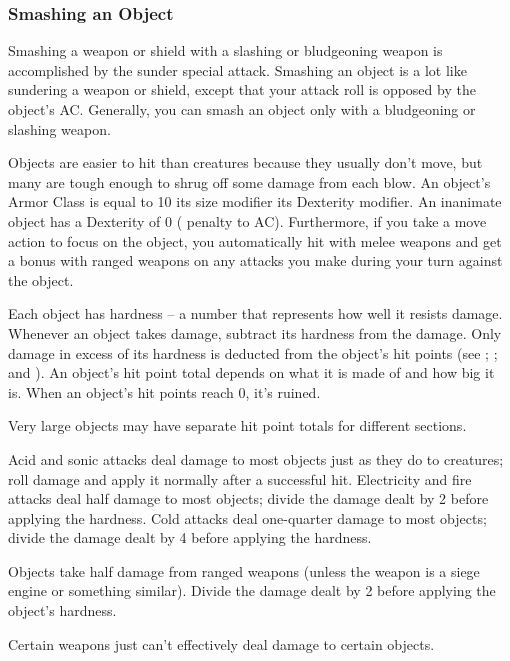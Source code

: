 \subsubsection{Smashing an Object}
Smashing a weapon or shield with a slashing or bludgeoning weapon is accomplished by the sunder special attack. Smashing an object is a lot like sundering a weapon or shield, except that your attack roll is opposed by the object's AC. Generally, you can smash an object only with a bludgeoning or slashing weapon.

 Objects are easier to hit than creatures because they usually don't move, but many are tough enough to shrug off some damage from each blow. An object's Armor Class is equal to 10 \add its size modifier \add its Dexterity modifier. An inanimate object has a Dexterity of 0 ( penalty to AC). Furthermore, if you take a move action to focus on the object, you automatically hit with melee weapons and get a  bonus with ranged weapons on any attacks you make during your turn against the object.

 Each object has hardness -- a number that represents how well it resists damage. Whenever an object takes damage, subtract its hardness from the damage. Only damage in excess of its hardness is deducted from the object's hit points (see ; ; and ).
 An object's hit point total depends on what it is made of and how big it is. When an object's hit points reach 0, it's ruined.

Very large objects may have separate hit point totals for different sections.

 Acid and sonic attacks deal damage to most objects just as they do to creatures; roll damage and apply it normally after a successful hit. Electricity and fire attacks deal half damage to most objects; divide the damage dealt by 2 before applying the hardness. Cold attacks deal one-quarter damage to most objects; divide the damage dealt by 4 before applying the hardness.

 Objects take half damage from ranged weapons (unless the weapon is a siege engine or something similar). Divide the damage dealt by 2 before applying the object's hardness.

 Certain weapons just can't effectively deal damage to certain objects.

